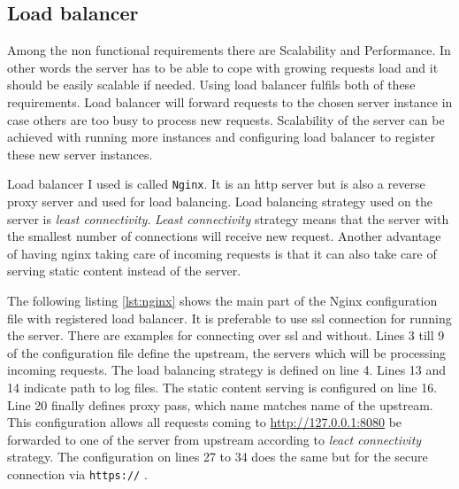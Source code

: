 \documentclass[thesis=M,english]{FITthesis}[2012/10/20]
\begin{document}
\subsection{Load balancer}

Among the non functional requirements there are Scalability and Performance. In other words the server has to be able to cope with growing requests load and it should be easily scalable if needed. Using load balancer fulfils both of these requirements. Load balancer will forward requests to the chosen server instance in case others are too busy to process new requests. Scalability of the server can be achieved with running more instances and configuring load balancer to register these new server instances.

Load balancer I used is called \verb|Nginx|. It is an http server but is also a reverse proxy server and used for load balancing. Load balancing strategy used on the server is \textit{least connectivity}. \textit{Least connectivity} strategy means that the server with the smallest number of connections will receive new request. \cite{nginx-lb} Another advantage of having nginx taking care of incoming requests is that it can also take care of serving static content instead of the server. 

The following listing \ref{lst:nginx} shows the main part of the Nginx configuration file with registered load balancer. It is preferable to use ssl connection for running the server. There are examples for connecting over ssl and without. Lines 3 till 9 of the configuration file define the upstream, the servers which will be processing incoming requests. The load balancing strategy is defined on line 4. Lines 13 and 14 indicate path to log files. The static content serving is configured on line 16. Line 20 finally defines proxy pass, which name matches name of the upstream. This configuration allows all requests coming to \url{http://127.0.0.1:8080} be forwarded to one of the server from upstream according to \textit{leact connectivity} strategy. The configuration on lines 27 to 34 does the same but for the secure connection via \verb|https://| .
\end{document}
